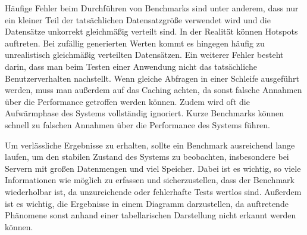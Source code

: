 Häufige Fehler beim Durchführen von Benchmarks sind unter anderem, dass nur ein kleiner Teil der tatsächlichen Datensatzgröße verwendet wird und die Datensätze unkorrekt gleichmäßig verteilt sind.
In der Realität können Hotspots auftreten.
Bei zufällig generierten Werten kommt es hingegen häufig zu unrealistisch gleichmäßig verteilten Datensätzen.
Ein weiterer Fehler besteht darin, dass man beim Testen einer Anwendung nicht das tatsächliche Benutzerverhalten nachstellt.
Wenn gleiche Abfragen in einer Schleife ausgeführt werden, muss man außerdem auf das Caching achten, da sonst falsche Annahmen über die Performance getroffen werden können.
Zudem wird oft die Aufwärmphase des Systems vollständig ignoriert.
Kurze Benchmarks können schnell zu falschen Annahmen über die Performance des Systems führen.

Um verlässliche Ergebnisse zu erhalten, sollte ein Benchmark ausreichend lange laufen, um den stabilen Zustand des Systems zu beobachten, insbesondere bei Servern mit großen Datenmengen und viel Speicher.
Dabei ist es wichtig, so viele Informationen wie möglich zu erfassen und sicherzustellen, dass der Benchmark wiederholbar ist, da unzureichende oder fehlerhafte Tests wertlos sind.
Außerdem ist es wichtig, die Ergebnisse in einem Diagramm darzustellen, da auftretende Phänomene sonst anhand einer tabellarischen Darstellung nicht erkannt werden können.

